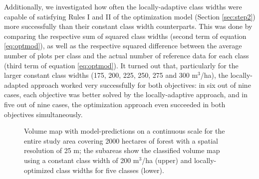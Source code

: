 Additionally, we investigated how often the locally-adaptive class widths were capable of satisfying Rules I and II of the optimization model (Section \ref{sec:step2}) more successfully than their constant class width counterparts. This was done by comparing the respective sum of squared class widths (second term of equation \ref{eq:optmod}), as well as the respective squared difference between the average number of plots per class and the actual number of reference data for each class (third term of equation \ref{eq:optmod}). It turned out that, particularly for the larger constant class widths (175, 200, 225, 250, 275 and 300 m$^3$/ha), the locally-adapted approach worked very successfully for both objectives: in six out of nine cases, each objective was better solved by the locally-adaptive approach, and in five out of nine cases, the optimization approach even succeeded in both objectives simultaneously.

\begin{figure}[H]
	\centering
	\caption{Volume map with model-predictions on a continuous scale for the entire study area covering 2000 hectares of forest with a spatial resolution of 25 m; the subareas show the classified volume map using a constant class width of 200 m$^3$/ha (upper) and locally-optimized class widths for five classes (lower).}
	\label{fig:volmap}
\end{figure}


